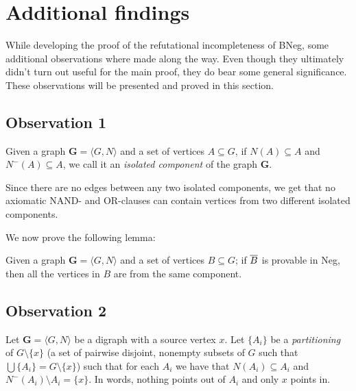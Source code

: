 \section{Additional findings}
\label{sec:Additional findings}
While developing the proof of the refutational incompleteness of BNeg, some additional observations where made along the way.
Even though they ultimately didn't turn out useful for the main proof, they do bear some general significance.
These observations will be presented and proved in this section.

\subsection{Observation 1}
\label{sub:Observation 1}
Given a graph $\mathbf{G} = \langle G,N \rangle$ and a set of vertices $A \subseteq G$, if $N(A) \subseteq A$ and $N^-(A) \subseteq A$, we call it an \textit{isolated component} of the graph $\mathbf{G}$.

Since there are no edges between any two isolated components, we get that no axiomatic NAND- and OR-clauses can contain vertices from two different isolated components.

We now prove the following lemma:
\begin{lemma}
  Given a graph $\mathbf{G} = \langle G,N \rangle$ and a set of vertices $B \subseteq G$; if $\ol{B}$ is provable in Neg, then all the vertices in $B$ are from the same component.
\end{lemma}
\subsection{Observation 2}
\label{sub:Observation 2}
Let $\mathbf{G} = \langle G,N \rangle$ be a digraph with a source vertex $x$.
Let $\{A_i\}$ be a \textit{partitioning} of $G \setminus \{ x \}$ (a set of pairwise disjoint, nonempty subsets of $G$ such that $\bigcup \{A_i\} = G \setminus \{ x \}$) such that for each $A_i$ we have that $N(A_i) \subseteq A_i$ and $N^-(A_i) \setminus A_i = \{ x \}$.
In words, nothing points out of $A_i$ and only $x$ points in.

